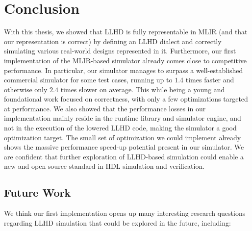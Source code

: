
\chapter{Conclusion}
With this thesis, we showed that LLHD is fully representable in MLIR (and that our representation is correct) by defining an LLHD dialect and correctly simulating various real-world designs represented in it.
Furthermore, our first implementation of the MLIR-based simulator already comes close to competitive performance. In particular, our simulator manages to surpass a well-established commercial simulator for some test cases, running up to $1.4$ times faster and otherwise only $2.4$ times slower on average. This while being a young and foundational work focused on correctness, with only a few optimizations targeted at performance.
We also showed that the performance losses in our implementation mainly reside in the runtime library and simulator engine, and not in the execution of the lowered LLHD code, making the simulator a good optimization target. The small set of optimization we could implement already shows the massive performance speed-up potential present in our simulator. We are confident that further exploration of LLHD-based simulation could enable a new and open-source standard in HDL simulation and verification.


\section{Future Work}
We think our first implementation opens up many interesting research questions regarding LLHD simulation that could be explored in the future, including:

